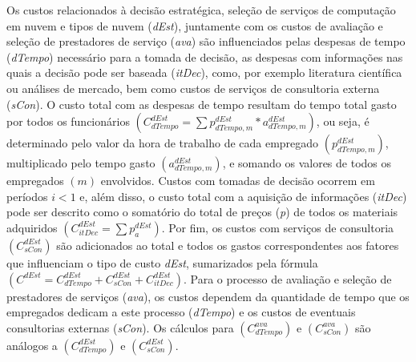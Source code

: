 \documentclass[tese,capa]{texufpel}
\begin{document}
Os custos relacionados à decisão estratégica, seleção de serviços de computação em nuvem e tipos de nuvem (\emph{dEst}), juntamente com os custos de avaliação e seleção de prestadores de serviço (\emph{ava}) são influenciados pelas despesas de tempo (\emph{dTempo}) necessário para a tomada de decisão, as despesas com informações nas quais a decisão pode ser baseada (\emph{itDec}), como, por exemplo literatura científica ou análises de mercado, bem como custos de serviços de consultoria externa (\emph{sCon}). O custo total com as despesas de tempo resultam do tempo total gasto por todos os funcionários $\left(C^{dEst}_{dTempo} = \sum p^{dEst}_{dTempo,m} * a^{dEst}_{dTempo,m}\right)$, ou seja, é determinado pelo valor da hora de trabalho de cada empregado $\left(p^{dEst}_{dTempo,m}\right)$, multiplicado pelo tempo gasto $\left(a^{dEst}_{dTempo,m}\right)$, e somando os valores de todos os empregados $\left(m\right)$ envolvidos. Custos com tomadas de decisão ocorrem em períodos $i < 1$ e, além disso, o custo total com a aquisição de informações (\emph{itDec}) pode ser descrito como o somatório do total de preços (\emph{p}) de todos os materiais adquiridos $\left(C^{dEst}_{itDec} = \sum p^{dEst}_{a}\right)$. Por fim, os custos com serviços de consultoria $\left(C^{dEst}_{sCon}\right)$ são adicionados ao total e todos os gastos correspondentes aos fatores que influenciam o tipo de custo \emph{dEst}, sumarizados pela fórmula $\left(C^{dEst} = C^{dEst}_{dTempo} + C^{dEst}_{sCon} + C^{dEst}_{itDec}\right)$. Para o processo de avaliação e seleção de prestadores de serviços (\emph{ava}), os custos dependem da quantidade de tempo que os empregados dedicam a este processo (\emph{dTempo}) e os custos de eventuais consultorias externas (\emph{sCon}). Os cálculos para $\left(C^{ava}_{dTempo}\right)$ e $\left(C^{ava}_{sCon}\right)$ são análogos a $\left(C^{dEst}_{dTempo}\right)$ e $\left(C^{dEst}_{sCon}\right)$.
\end{document}
